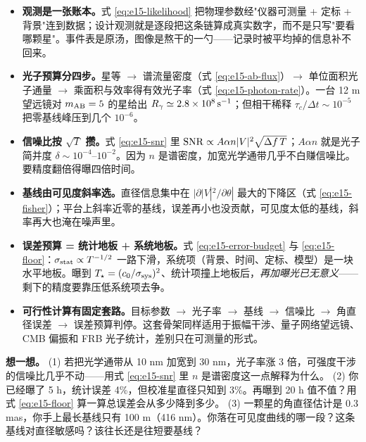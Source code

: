 \begin{itemize}
  \item \textbf{观测是一张账本。}式 \eqref{eq:e15-likelihood} 把物理参数经"仪器可测量 + 定标 + 背景"连到数据；设计观测就是逐段把这条链算成真实数字，而不是只写"要看哪颗星"。事件表是原汤，图像是熬干的一勺——记录时被平均掉的信息补不回来。
  \item \textbf{光子预算分四步。}星等 \(\to\) 谱流量密度（式 \eqref{eq:e15-ab-flux}）\(\to\) 单位面积光子通量 \(\to\) 乘面积与效率得有效光子率（式 \eqref{eq:e15-photon-rate}）。一台 12 m 望远镜对 \(m_{\rm AB}=5\) 的星给出 \(R_\gamma\simeq2.8\times10^8\,{\rm s^{-1}}\)；但相干稀释 \(\tau_c/\Delta t\sim10^{-5}\) 把零基线峰压到几个 \(10^{-6}\)。
  \item \textbf{信噪比按 \(\sqrt T\) 攒。}式 \eqref{eq:e15-snr} 里 \({\rm SNR}\propto A\alpha n|V|^2\sqrt{\Delta f\,T}\)；\(A\alpha n\) 就是光子简并度 \(\delta\sim10^{-4}\)--\(10^{-2}\)。因为 \(n\) 是谱密度，加宽光学通带几乎不白赚信噪比。要精度翻倍得曝四倍时间。
  \item \textbf{基线由可见度斜率选。}直径信息集中在 \(|\partial|V|^2/\partial\theta|\) 最大的下降区（式 \eqref{eq:e15-fisher}）；平台上斜率近零的基线，误差再小也没贡献，可见度太低的基线，斜率再大也淹在噪声里。
  \item \textbf{误差预算 = 统计地板 + 系统地板。}式 \eqref{eq:e15-error-budget} 与 \eqref{eq:e15-floor}：\(\sigma_{\rm stat}\propto T^{-1/2}\) 一路下滑，系统项（背景、时间、定标、模型）是一块水平地板。曝到 \(T_\star=(c_0/\sigma_{\rm sys})^2\)、统计项撞上地板后，\emph{再加曝光已无意义}——剩下的精度要靠压低系统项去争。
  \item \textbf{可行性计算有固定套路。}目标参数 \(\to\) 光子率 \(\to\) 基线 \(\to\) 信噪比 \(\to\) 角直径误差 \(\to\) 误差预算判停。这套骨架同样适用于振幅干涉、量子网络望远镜、CMB 偏振和 FRB 光子统计，差别只在可测量的形式。
\end{itemize}

\medskip
\noindent\textbf{想一想。}
(1) 若把光学通带从 10 nm 加宽到 30 nm，光子率涨 3 倍，可强度干涉的信噪比几乎不动——用式 \eqref{eq:e15-snr} 里 \(n\) 是谱密度这一点解释为什么。
(2) 你已经曝了 5 h，统计误差 4\%，但校准星直径只知到 3\%。再曝到 20 h 值不值？用式 \eqref{eq:e15-floor} 算一算总误差会从多少降到多少。
(3) 一颗星的角直径估计是 0.3 mas，你手上最长基线只有 100 m（416 nm）。你落在可见度曲线的哪一段？这条基线对直径敏感吗？该往长还是往短要基线？
